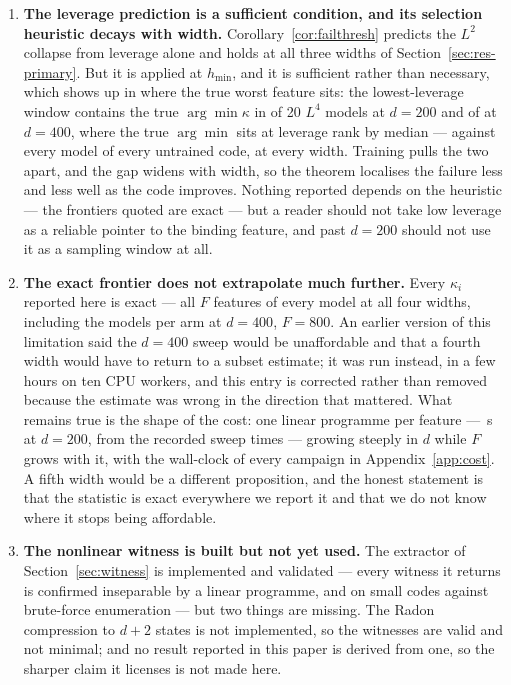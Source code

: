 \begin{enumerate}[leftmargin=*,itemsep=1pt]
\item \textbf{The leverage prediction is a sufficient condition, and its selection heuristic decays
with width.} Corollary~\ref{cor:failthresh} predicts the $L^2$ collapse from leverage alone and
holds at all three widths of Section~\ref{sec:res-primary}. But it is applied at $h_{\min}$, and it
is sufficient rather than necessary, which shows up in where the true worst feature sits: the
lowest-leverage window contains the true $\arg\min\kappa$ in \FullLfourTwoHundredArgminFound{} of 20
$L^4$ models at $d=200$ and \SubsetFourHundredFound{} of \ScSeeds{} at $d=400$, where the true
$\arg\min$ sits at leverage rank \SubsetFourHundredRank{} by median --- against every model of every
untrained code, at every width. Training pulls the two apart, and the gap widens with width, so the
theorem localises the failure less and less well as the code improves. Nothing reported depends on
the heuristic --- the frontiers quoted are exact --- but a reader should not take low leverage as a
reliable pointer to the binding feature, and past $d=200$ should not use it as a sampling window at
all.

\item \textbf{The exact frontier does not extrapolate much further.} Every $\kappa_i$ reported here is
exact --- all $F$ features of every model at all four widths, including the \ScSeeds{} models per arm
at $d=400$, $F=800$. An earlier version of this limitation said the $d=400$ sweep would be
unaffordable and that a fourth width would have to return to a subset estimate; it was run instead,
in a few hours on ten CPU workers, and this entry is corrected rather than removed because the
estimate was wrong in the direction that mattered. What remains true is the shape of the cost: one
linear programme per feature --- \FrontierLpSecondsTwoHundred\,s at $d=200$, from the recorded sweep
times --- growing steeply in $d$ while $F$ grows with it, with the wall-clock of every campaign in
Appendix~\ref{app:cost}. A fifth width would be a different
proposition, and the honest statement is that the statistic is exact everywhere we report it and that
we do not know where it stops being affordable.

\item \textbf{The nonlinear witness is built but not yet used.} The extractor of
Section~\ref{sec:witness} is implemented and validated --- every witness it returns is confirmed
inseparable by a linear programme, and on small codes against brute-force enumeration --- but two
things are missing. The Radon compression to $d+2$ states is not implemented, so the witnesses are
valid and not minimal; and no result reported in this paper is derived from one, so the sharper
claim it licenses is not made here.


\end{enumerate}
